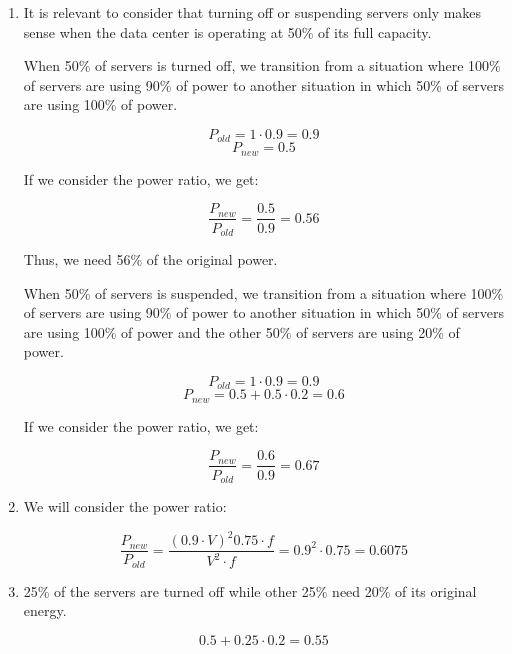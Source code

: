 \begin{enumerate}

\item It is relevant to consider that turning off or suspending servers only
makes sense when the data center is operating at 50\% of its full capacity.

When 50\% of servers is turned off, we transition from a situation where 100\%
of servers are using 90\% of power to another situation in which 50\% of servers
are using 100\% of power.

\[P_{old} = 1 \cdot 0.9 = 0.9\]
\[P_{new} = 0.5 \]

If we consider the power ratio, we get:

\[\frac{P_{new}}{P_{old}} = \frac{0.5}{0.9} = 0.56\]

Thus, we need 56\% of the original power.

When 50\% of servers is suspended, we transition from a situation where 100\% of
servers are using 90\% of power to another situation in which 50\% of servers
are using 100\% of power and the other 50\% of servers are using 20\% of power.

\[P_{old} = 1 \cdot 0.9 = 0.9\]
\[P_{new} = 0.5 + 0.5 \cdot 0.2 = 0.6 \]

If we consider the power ratio, we get:

\[\frac{P_{new}}{P_{old}} = \frac{0.6}{0.9} = 0.67\]

\item We will consider the power ratio:

\[
\frac{P_{new}}{P_{old}} =
\frac{(0.9 \cdot V)^2 0.75 \cdot f}{V^2 \cdot f} =
0.9^2 \cdot 0.75 =
0.6075
\]

\item 25\% of the servers are turned off while other 25\% need 20\% of
its original energy.

\[
0.5 + 0.25 \cdot 0.2 = 0.55
\]

\end{enumerate}

